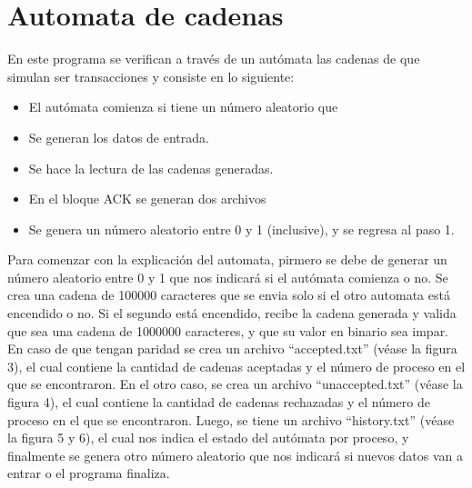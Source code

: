 \documentclass[a4paper]{article}
\begin{document}
		\section{Automata de cadenas}
			En este programa se verifican a través de un autómata las cadenas de que simulan ser transacciones y consiste en lo siguiente: 
			\begin{itemize}
                \item El autómata comienza si tiene un número aleatorio que 
                \item Se generan los datos de entrada.
                \item Se hace la lectura de las cadenas generadas.
                \item En el bloque ACK se generan dos archivos 
                \item  Se genera un número aleatorio entre 0 y 1 (inclusive), y se regresa al paso 1. 
            \end{itemize}
            Para comenzar con la explicación del automata, pirmero se debe de generar un número aleatorio entre 0 y 1 que nos indicará si el autómata comienza o no.
            Se crea una cadena de 100000 caracteres que se envia solo si el otro automata está encendido o no.
            Si el segundo está encendido, recibe la cadena generada y valida que sea una cadena de 1000000 caracteres, y que su valor en binario sea impar. 
            En caso de que tengan paridad se crea un archivo ``accepted.txt'' (véase la figura 3), el cual contiene la cantidad de cadenas aceptadas y el número de proceso en el que se encontraron. 
            En el otro caso, se crea un archivo ``unaccepted.txt'' (véase la figura 4), el cual contiene la cantidad de cadenas rechazadas y el número de proceso en el que se encontraron. 
            Luego, se tiene un archivo ``history.txt'' (véase la figura 5 y 6), el cual nos indica el estado del autómata por proceso, y finalmente se genera otro número aleatorio que nos indicará si nuevos datos van a entrar o el programa finaliza. 
            
\end{document}
